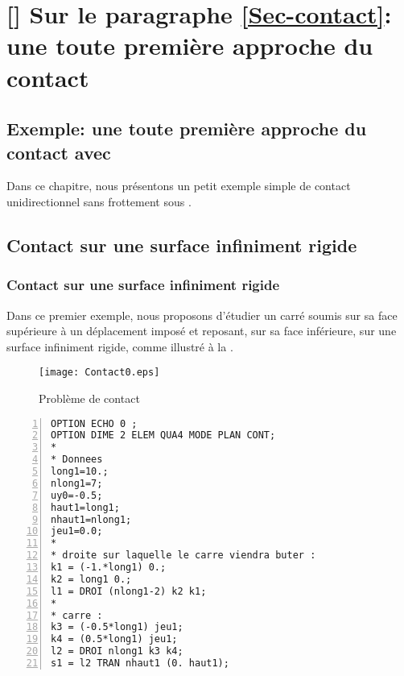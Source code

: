 \ifVersionAvecExemplesSepares
   \chapter{[\castem] Sur le paragraphe \ref{Sec-contact}: une toute première approche du contact}
\else
   \section{Exemple: une toute première approche du contact avec \castem}
\fi

Dans ce chapitre, nous présentons un petit exemple simple de contact unidirectionnel 
sans frottement sous \castem.





\medskip
\ifVersionAvecExemplesSepares
   \section{Contact sur une surface infiniment rigide}
\else
   \subsection{Contact sur une surface infiniment rigide}
\fi

Dans ce premier exemple, nous proposons d'étudier un carré soumis sur sa face supérieure à un
déplacement imposé et reposant, sur sa face inférieure, sur une surface infiniment rigide, comme illustré
à la .
\begin{figure}[ht]
   \center
   \texttt{[image: Contact0.eps]}
   \caption{\label{Fig-Cont0} Problème de contact}
\end{figure}

\color{gris}\scriptsize
\begin{multicols}{2}
\begin{Verbatim}[numbers=left,numbersep=3pt]
OPTION ECHO 0 ;
OPTION DIME 2 ELEM QUA4 MODE PLAN CONT;
*
* Donnees
long1=10.;
nlong1=7;
uy0=-0.5;
haut1=long1;
nhaut1=nlong1;
jeu1=0.0;
*
* droite sur laquelle le carre viendra buter :
k1 = (-1.*long1) 0.;
k2 = long1 0.;
l1 = DROI (nlong1-2) k2 k1;
*
* carre :
k3 = (-0.5*long1) jeu1;
k4 = (0.5*long1) jeu1;
l2 = DROI nlong1 k3 k4;
s1 = l2 TRAN nhaut1 (0. haut1);
\end{Verbatim}
\end{multicols}
\color{black}\normalsize

